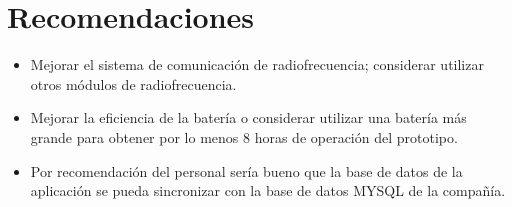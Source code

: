\section{Recomendaciones}

\begin{itemize}
	\item Mejorar el sistema de comunicación de radiofrecuencia; considerar utilizar otros módulos de radiofrecuencia.
		
	\item Mejorar la eficiencia de la batería o considerar utilizar una batería más grande para obtener por lo menos 8 horas de operación del prototipo. 
	
	\item Por recomendación del personal sería bueno que la base de datos de la aplicación se pueda sincronizar con la base de datos MYSQL de la compañía. 
\end{itemize}

\clearpage

\mbox{}
\clearpage
